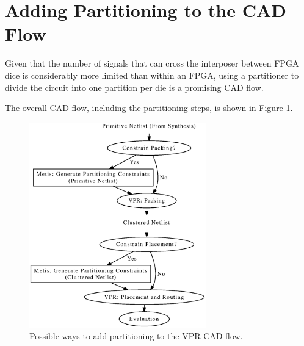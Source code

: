 \section{Adding Partitioning to the CAD Flow}
\label{sec:CADflow}
Given that the number of signals that can cross the interposer between FPGA dice is considerably more limited than within an FPGA, using a partitioner to divide the circuit into one partition per die is a promising CAD flow.

The overall CAD flow, including the partitioning steps, is shown in Figure \ref{fig:partitioning_cad_flow}.
\begin{figure}[!htbp]
\centering
\includegraphics[height=3.5in]{partitioning_cad_flow.eps}
\caption{Possible ways to add partitioning to the VPR CAD flow.}
\label{fig:partitioning_cad_flow}
\end{figure}

